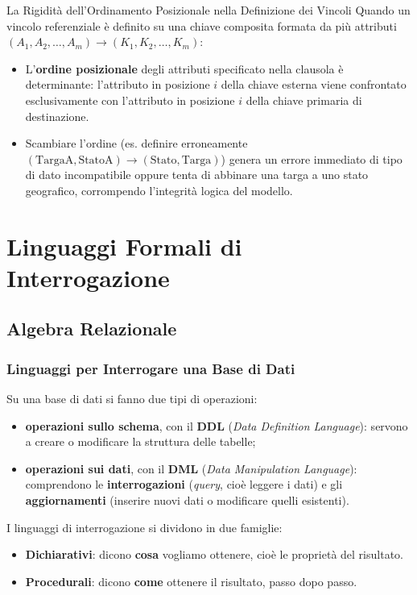 \documentclass[12pt]{extarticle}
\begin{document}
\begin{cbox}{La Rigidità dell'Ordinamento Posizionale nella Definizione dei Vincoli}
\noindent Quando un vincolo referenziale è definito su una chiave composita formata da più attributi $(A_1, A_2, \dots, A_m) \to (K_1, K_2, \dots, K_m)$:
\begin{itemize}
    \item L'\textbf{ordine posizionale} degli attributi specificato nella clausola è determinante: l'attributo in posizione $i$ della chiave esterna viene confrontato esclusivamente con l'attributo in posizione $i$ della chiave primaria di destinazione.
    \item Scambiare l'ordine (es. definire erroneamente $(\text{TargaA}, \text{StatoA}) \to (\text{Stato}, \text{Targa})$) genera un errore immediato di tipo di dato incompatibile oppure tenta di abbinare una targa a uno stato geografico, corrompendo l'integrità logica del modello.
\end{itemize}
\end{cbox}

\newpage

\section{Linguaggi Formali di Interrogazione}
\subsection{Algebra Relazionale}

\subsubsection{Linguaggi per Interrogare una Base di Dati}
\noindent Su una base di dati si fanno due tipi di operazioni:
\begin{itemize}
    \item \textbf{operazioni sullo schema}, con il \textbf{DDL} (\textit{Data Definition Language}): servono a creare o modificare la struttura delle tabelle;
    \item \textbf{operazioni sui dati}, con il \textbf{DML} (\textit{Data Manipulation Language}): comprendono le \textbf{interrogazioni} (\textit{query}, cioè leggere i dati) e gli \textbf{aggiornamenti} (inserire nuovi dati o modificare quelli esistenti).
\end{itemize}

\medskip
\noindent I linguaggi di interrogazione si dividono in due famiglie:
\begin{itemize}
    \item \textbf{Dichiarativi}: dicono \textbf{cosa} vogliamo ottenere, cioè le proprietà del risultato.
    \item \textbf{Procedurali}: dicono \textbf{come} ottenere il risultato, passo dopo passo.
\end{itemize}
\end{document}
